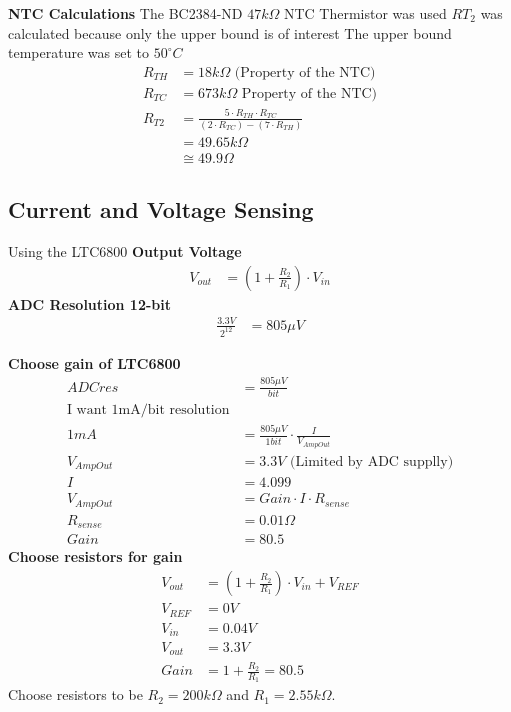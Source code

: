 \documentclass{article}
\numberwithin{figure}{section}
\numberwithin{equation}{section}
\begin{document}
{\textbf{NTC Calculations}
The BC2384-ND $47k\Omega$ NTC Thermistor was used
$RT_2$ was calculated because only the upper bound is of interest
The upper bound temperature was set to $50^{\circ}C$
\begin{align}
  \label{eq:ntc}
  R_{TH} &= 18k\Omega \mbox{ (Property of the NTC)}\\
  R_{TC} &= 673k\Omega \mbox{ Property of the NTC)}\\
  R_{T2} &= \frac{5 \cdot R_{TH} \cdot R_{TC}}{(2\cdot R_{TC})-(7\cdot R_{TH})} \\
  &= 49.65k\Omega \\
  &\cong 49.9\Omega
\end{align}


\subsection{Current and Voltage Sensing}\label{app:cvsense}
Using the LTC6800
\textbf{Output Voltage}
\begin{align}
  \label{eq:vout}
  V_{out} &= \left(1+\frac{R_2}{R_1}\right)\cdot V_{in}
\end{align}
\textbf{ADC Resolution 12-bit}
\begin{align}
  \label{eq:adcres}
  \frac{3.3V}{2^{12}} &= 805\mu V
\end{align}

\textbf{Choose gain of LTC6800}
\begin{align}
  \label{eq:asense}
  ADCres &= \frac{805\mu V}{bit} \\
  \mbox{I want 1mA/bit resolution} \\
  1mA &= \frac{805\mu V}{1bit} \cdot \frac{I}{V_{AmpOut}} \\
  V_{AmpOut} &= 3.3V \mbox{ (Limited by ADC supplly)} \\
  I &= 4.099 \\
  V_{AmpOut} &= Gain \cdot I \cdot R_{sense} \\
  R_{sense} &= 0.01 \Omega \\
  Gain &= 80.5
\end{align}
\textbf{Choose resistors for gain}
\begin{align}
  \label{eq:gainresistors}
  V_{out} &= \left(1+\frac{R_2}{R_1}\right)\cdot V_{in} + V_{REF} \\
  V_{REF} &= 0V \\
  V_{in} &= 0.04V \\
  V_{out} &= 3.3V \\
  Gain &= 1+\frac{R_2}{R_1} = 80.5
\end{align}
Choose resistors to be $R_2=200k\Omega$ and $R_1=2.55k\Omega$.

}
\end{document}
